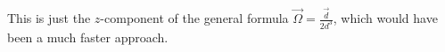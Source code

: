 \documentclass[english, parskip=full]{scrartcl}
\renewcommand{\i}{\text{i}}
\begin{document}
This is just the $z$-component of the general formula $\vec{\Omega} = \frac{\vec{d}}{2d^3}$, which would have been a much faster approach.
\end{document}
